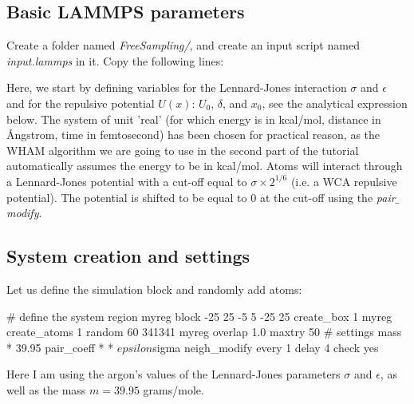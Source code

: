 \subsection{Basic LAMMPS parameters}

\noindent Create a folder named \textit{FreeSampling/}, and create an input script
named \textit{input.lammps} in it. Copy the following lines:


\noindent Here, we start by defining variables for the Lennard-Jones
interaction $\sigma$ and $\epsilon$ and for
the repulsive potential $U (x)$: $U_0$, $\delta$, and $x_0$, 
see the analytical expression below.
The system of unit 'real' (for which energy is in kcal/mol, distance in Ångstrom,
time in femtosecond) has been chosen for practical reason,
as the WHAM algorithm we are going to use in the second
part of the tutorial automatically assumes the energy to
be in kcal/mol. Atoms will interact through a
Lennard-Jones potential with a cut-off equal to 
$\sigma {} ^ {1/6}$ (i.e. a WCA repulsive
potential). The potential is shifted to be equal to 0 at
the cut-off using the \textit{pair$\_$modify}.

\subsection{System creation and settings}

\noindent Let us define the simulation block and randomly add atoms:

\begin{lcverbatim}
# define the system
region myreg block -25 25 -5 5 -25 25
create_box 1 myreg
create_atoms 1 random 60 341341 myreg overlap 1.0 maxtry 50
# settings
mass * 39.95
pair_coeff * * ${epsilon} ${sigma}
neigh_modify every 1 delay 4 check yes
\end{lcverbatim}

\noindent Here I am using the argon's values of the Lennard-Jones parameters $\sigma$ and
$\epsilon$, as well as the mass $m = 39.95$
grams/mole. 

